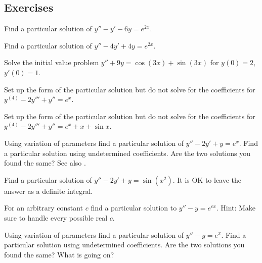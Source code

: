 \subsection{Exercises}

\begin{exercise}
Find a particular solution of
$y''-y' -6y = e^{2x}$.
\end{exercise}

\begin{exercise}
Find a particular solution of
$y''-4y' +4y = e^{2x}$.
\end{exercise}

\begin{exercise}
Solve the initial value problem
$y''+9y = \cos (3x) + \sin (3x)$ for $y(0) = 2$, $y'(0) = 1$.
\end{exercise}

\begin{exercise}
Set up the form of the particular solution but do not solve
for the coefficients for $y^{(4)}-2y'''+y'' = e^x$.
\end{exercise}

\begin{exercise}
Set up the form of the particular solution but do not solve
for the coefficients for $y^{(4)}-2y'''+y'' = e^x + x + \sin x$.
\end{exercise}

\begin{exercise}
\pagebreak[2]
\leavevmode
\begin{tasks}
\task Using variation of parameters find a particular solution of
$y''-2y'+y = e^x$.
\task Find a particular solution using undetermined
coefficients.
\task Are the two solutions you found the same?
See also .
\end{tasks}
\end{exercise}

\begin{exercise}
Find a particular solution of
$y''-2y' +y = \sin (x^2)$.  It is OK to leave the answer as a definite
integral.
\end{exercise}

\begin{exercise}
For an arbitrary constant $c$ find a particular solution
to $y''-y=e^{cx}$.  Hint: Make sure to handle every possible real $c$.
\end{exercise}

\begin{exercise} \label{exercise:diffvarparunder}
\pagebreak[2]
\leavevmode
\begin{tasks}
\task Using variation of parameters find a particular solution of
$y''-y = e^x$.
\task Find a particular solution using undetermined
coefficients.
\task Are the two solutions you found the same?
What is going on?
\end{tasks}
\end{exercise}

